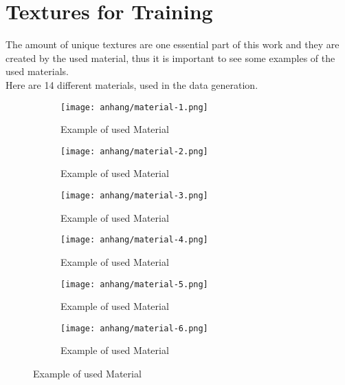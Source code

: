 \chapter{Textures for Training}
\label{appendix:materials-for-training}

	The amount of unique textures are one essential part of this work and they are created by the used material, thus it is important to see some examples of the used materials.\\
	Here are 14 different materials, used in the data generation.
	
	\begin{figure}[h]
		\centering
		\begin{subfigure}{0.45\textwidth}
			\centering
			\texttt{[image: anhang/material-1.png]}
			\caption[Example of used Material, created by \cite{Quixel}]{Example of used Material}
		\end{subfigure}
		\begin{subfigure}{0.45\textwidth}
			\centering
			\texttt{[image: anhang/material-2.png]}
			\caption[Example of used Material, created by \cite{Quixel}]{Example of used Material}
		\end{subfigure}
		
		\begin{subfigure}{0.45\textwidth}
			\centering
			\texttt{[image: anhang/material-3.png]}
			\caption[Example of used Material, created by \cite{Quixel}]{Example of used Material}
		\end{subfigure}
		\begin{subfigure}{0.45\textwidth}
			\centering
			\texttt{[image: anhang/material-4.png]}
			\caption[Example of used Material, created by \cite{Quixel}]{Example of used Material}
		\end{subfigure}
		
		\begin{subfigure}{0.45\textwidth}
			\centering
			\texttt{[image: anhang/material-5.png]}
			\caption[Example of used Material, created by \cite{Quixel}]{Example of used Material}
		\end{subfigure}
		\begin{subfigure}{0.45\textwidth}
			\centering
			\texttt{[image: anhang/material-6.png]}
			\caption[Example of used Material, created by \cite{Quixel}]{Example of used Material}
		\end{subfigure}
	\end{figure}
	
